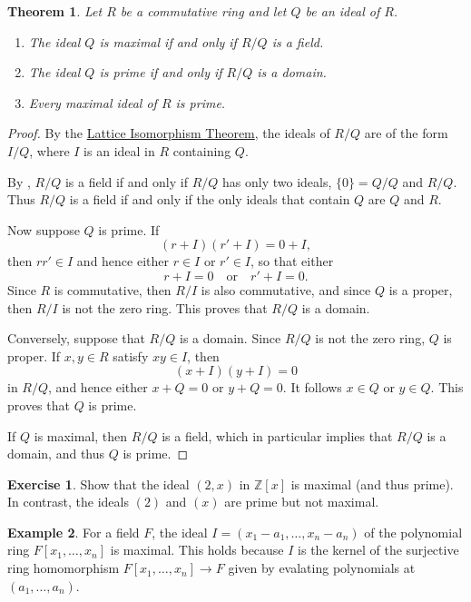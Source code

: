 \documentclass[12pt]{report}
\newtheorem{theorem}{Theorem}[chapter]
\numberwithin{equation}{section}
\numberwithin{theorem}{chapter}
\theoremstyle{definition}
\newtheorem{example}[theorem]{Example}
\newtheorem{exercise}{Exercise}
\newtheorem*{basic properties}{Basic Properties}
\newtheorem*{Important Remark}{Important Remark}
\newcommand{\Z}{\mathbb{Z}}
\begin{document}
\begin{theorem}\label{maximal and prime ideals}
Let $R$ be a commutative ring and let $Q$ be an ideal of $R$. 
\begin{enumerate}[itemsep=0.1em,leftmargin=20pt]
\item The ideal $Q$ is maximal if and only if $R/Q$ is a field. 
\item The ideal $Q$ is prime if and only if $R/Q$ is a domain. 
\item Every maximal ideal of $R$ is prime.
\end{enumerate}
\end{theorem}




\begin{proof} 
By the \hyperref[lattice iso rings]{Lattice Isomorphism Theorem}, the ideals of $R/Q$ are of the form $I/Q$, where $I$ is an ideal in $R$ containing $Q$.

By , $R/Q$ is a field if and only if $R/Q$ has only two ideals, $\{ 0 \} = Q/Q$ and $R/Q$. Thus $R/Q$ is a field if and only if the only ideals that contain $Q$ are $Q$ and $R$.

Now suppose $Q$ is prime. If 
$$(r + I)(r' + I) = 0 + I,$$ 
then $rr' \in I$ and hence either $r \in I$ or $r' \in I$, so that either 
$$r + I = 0 \quad \text{or} \quad r'+ I  = 0.$$
Since $R$ is commutative, then $R/I$ is also commutative, and since $Q$ is a proper, then $R/I$ is not the zero ring. This proves that $R/Q$ is a domain.

Conversely, suppose that $R/Q$ is a domain. Since $R/Q$ is not the zero ring, $Q$ is proper. If $x,y \in R$ satisfy $xy \in I$, then 
$$(x + I)(y + I) = 0$$ 
in $R/Q$, and hence either $x+ Q = 0$ or $y + Q = 0$. It follows $x \in Q$ or $y \in Q$. This proves that $Q$ is prime.

If $Q$ is maximal, then $R/Q$ is a field, which in particular implies that $R/Q$ is a domain, and thus $Q$ is prime. 
\end{proof}



\begin{exercise}
Show that the ideal $(2,x)$ in $\Z[x]$ is maximal (and thus prime). In contrast, the ideals $(2)$ and $(x)$ are prime but not maximal.
\end{exercise}



\begin{example} 
For a field $F$, the ideal $I = (x_1 - a_1, \dots, x_n - a_n)$ of the polynomial ring $F[x_1, \dots, x_n]$ is maximal. This holds because
  $I$ is the kernel of the surjective ring homomorphism $F[x_1, \dots, x_n] \to F$ given by evalating polynomials at $(a_1, \dots, a_n)$.
\end{example}
\end{document}
